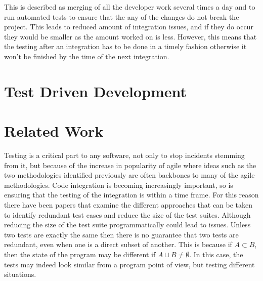 This is described as merging of all the developer work several times a day and to run automated tests to ensure that the any of the changes do not break the project. This leads to reduced amount of integration issues, and if they do occur they would be smaller as the amount worked on is less. However, this means that the testing after an integration has to be done in a timely fashion otherwise it won’t be finished by the time of the next integration.

\section{Test Driven Development}

\section{Related Work}

Testing is a critical part to any software, not only to stop incidents stemming from it, but because of the increase in popularity of agile where ideas such as the two methodologies identified previously are often backbones to many of the agile methodologies. Code integration is becoming increasingly important, so is ensuring that the testing of the integration is within a time frame. For this reason there have been papers that examine the different approaches that can be taken to identify redundant test cases and reduce the size of the test suites. Although reducing the size of the test suite programmatically could lead to issues. Unless two tests are exactly the same then there is no guarantee that two tests are redundant, even when one is a direct subset of another. This is because if $A \subset B$, then the state of the program may be different if $A \sqcup B \ne  \emptyset $. In this case, the tests may indeed look similar from a program point of view, but testing different situations.
